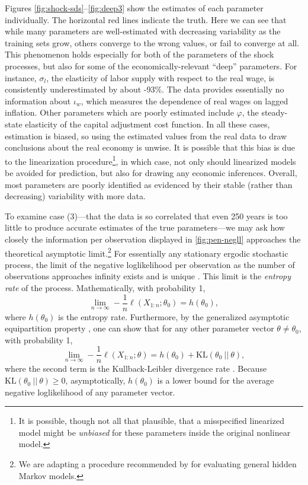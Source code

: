 \documentclass[11pt]{article}
\begin{document}
Figures \ref{fig:shock-sds}--\ref{fig:deep3} show the estimates of each
parameter individually. The horizontal red lines indicate the truth.
Here we can see that while many parameters are well-estimated with
decreasing variability as the training sets grow, others converge to the
wrong values, or fail to converge at all. This phenomenon holds
especially for both of the parameters of the shock processes, but also
for some of the economically-relevant ``deep'' parameters. For instance,
\(\sigma_l\), the elasticity of labor supply with respect to the real
wage, is consistently underestimated by about -93\%. The data provides
essentially no information about \(\iota_w\), which measures the
dependence of real wages on lagged inflation. Other parameters which are
poorly estimated include \(\varphi\), the steady-state elasticity of the
capital adjustment cost function. In all these cases, estimation is
biased, so using the estimated values from the real data to draw
conclusions about the real economy is unwise. It is possible that this
bias is due to the linearization procedure\footnote{It is possible,
  though not all that plausible, that a misspecified linearized model
  might be \emph{unbiased} for these parameters inside the original
  nonlinear model.}, in which case, not only should linearized models be
avoided for prediction, but also for drawing any economic inferences.
Overall, most parameters are poorly identified as evidenced by their
stable (rather than decreasing) variability with more data.

To examine case (3)---that the data is so correlated that even 250 years
is too little to produce accurate estimates of the true parameters---we
may ask how closely the information per observation displayed in
\autoref{fig:pen-negll} approaches the theoretical asymptotic
limit.\footnote{We are adapting a procedure recommended by \citet{Andy-Fraser-on-HMMs} for evaluating general hidden Markov models.}
For essentially any stationary ergodic stochastic process, the limit of
the negative loglikelihood per observation as the number of observations
approaches infinity exists and is unique \citep{Gray-entropy-2nd}. This
limit is the \emph{entropy rate} of the process. Mathematically, with
probability 1, \[
\lim_{n\rightarrow\infty} -\frac{1}{n}\ell(X_{1:n}; \theta_0) = h(\theta_0),
\] where \(h(\theta_0)\) is the entropy rate. Furthermore, by the
generalized asymptotic equipartition property
\citep{Algoet-and-Cover-on-AEP}, one can show that for any other
parameter vector \(\theta \neq \theta_0\), with probability 1, \[
\lim_{n\rightarrow\infty} -\frac{1}{n}\ell(X_{1:n}; \theta) = h(\theta_0) + \mathrm{KL}(\theta_0\ ||\ \theta),
\] where the second term is the Kullback-Leibler divergence rate
\citep{Gray-entropy-2nd}. Because
\(\mathrm{KL}(\theta_0\ ||\ \theta) \geq 0\), asymptotically,
\(h(\theta_0)\) is a lower bound for the average negative loglikelihood
of any parameter vector.
\end{document}
